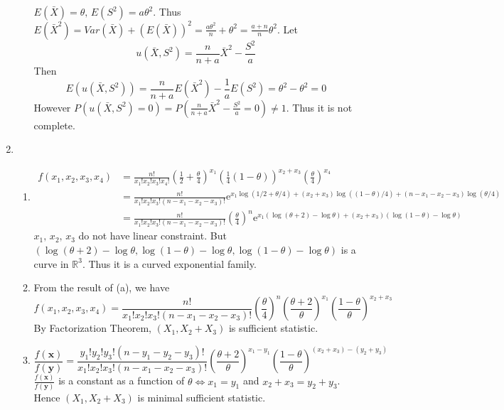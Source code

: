 \documentclass{article}
\begin{document}
\begin{enumerate}[leftmargin = 0 em, label = \arabic*., font = \bfseries]
\begin{enumerate}
	      	 $E(\bar{X}) = \theta,\, E(S^2) = a \theta^2$. Thus $E(\bar{X}^2) = Var(\bar{X}) + (E(\bar{X}))^2 = \frac{a \theta^2}{n} + \theta^2 = \frac{a + n}{n} \theta^2 $. Let
	      	 \[u(\bar{X}, S^2) = \frac{n}{n + a} \bar{X}^2 - \frac{S^2}{a}\]
	      	 Then
	      	 \[E(u(\bar{X}, S^2)) = \frac{n}{n+a} E(\bar{X}^2) - \frac{1}{a} E(S^2) = \theta^2 - \theta^2 = 0\]
	      	 However $P(u(\bar{X}, S^2) = 0) = P(\frac{n}{n+a} \bar{X}^2 - \frac{S^2}{a} = 0) \neq 1$. Thus it is not complete.
	      \end{enumerate}
	      
	      \item 
	      \begin{enumerate}
	      	\item 
	      	\begin{align*}
	      	f(x_1, x_2 , x_3, x_4) & = \frac{n!}{x_1 ! x_2 ! x_3 ! x_4 !} \left(\frac{1}{2} + \frac{\theta}{4}\right)^{x_1} \left(\frac{1}{4}(1 - \theta)\right)^{x_2 + x_3} \left(\frac{\theta}{4}\right)^{x_4}\\
	      	& = \frac{n!}{x_1 ! x_2 ! x_3 ! (n - x_1 - x_2 - x_3) !} \mathrm{e}^{x_1 \log (1/2 + \theta / 4) + (x_2 + x_3) \log( (1 - \theta)/4) + (n - x_1 - x_2 - x_3) \log (\theta / 4)}\\
	      	& = \frac{n!}{x_1 ! x_2 ! x_3 ! (n - x_1 - x_2 - x_3) !} \left( \frac{\theta}{4}\right)^n \mathrm{e}^{x_1 (\log (\theta + 2) - \log \theta) + (x_2 + x_3) (\log (1 - \theta) - \log \theta) }
	      	\end{align*}
	      	$x_1,\, x_2 ,\, x_3$ do not have linear constraint. But $(\log (\theta + 2) - \log \theta , \log (1 - \theta) - \log \theta , \log (1 - \theta) - \log \theta)$ is a curve in $\mathbb{R}^3$. Thus it is a curved exponential family.
	      	\item 
	      	From the result of (a), we have
	      	\[f(x_1, x_2 , x_3, x_4) = \frac{n!}{x_1 ! x_2 ! x_3 ! (n - x_1 - x_2 - x_3) !} \left(\frac{\theta}{4}\right)^n \left(\frac{\theta + 2}{\theta}\right)^{x_1} \left(\frac{1 - \theta}{\theta}\right)^{x_2 + x_3}\]
	      	By Factorization Theorem, $(X_1, X_2 + X_3)$ is sufficient statistic.
	      	\item 
	      	\[\frac{f(\bm x)}{f(\bm y)} = \frac{y_1! y_2 ! y _3 ! (n - y_1 - y_ 2 - y_3)!}{x_1 ! x_2 ! x_3 ! (n - x_1 - x_2 - x_ 3)!} \left(\frac{\theta + 2}{\theta}\right)^{x_1 - y_1} \left(\frac{1 - \theta}{\theta}\right)^{(x_2 + x_3) - (y_2 + y_3)}\]
	      	$\frac{f(\bm x)} {f(\bm y)}$ is a constant as a function of $\theta \iff x_1 = y_1$ and $x_2 + x_3 = y_2 + y_3$. Hence $(X_1, X_2 + X_3)$ is minimal sufficient statistic.
	      \end{enumerate}


\end{enumerate}
\end{document}
